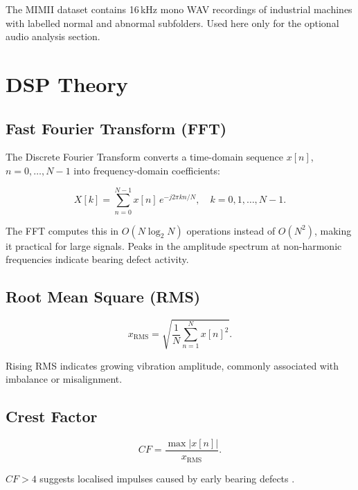 \documentclass[12pt,a4paper]{article}
\begin{document}
The MIMII dataset \cite{purohit2019} contains 16\,kHz mono WAV
recordings of industrial machines with labelled normal and abnormal
subfolders. Used here only for the optional audio analysis section.

\section{DSP Theory}

\subsection{Fast Fourier Transform (FFT)}

The Discrete Fourier Transform converts a time-domain sequence
$x[n]$, $n = 0, \ldots, N-1$ into frequency-domain coefficients:

\begin{equation}
  X[k] = \sum_{n=0}^{N-1} x[n]\, e^{-j2\pi kn/N},
  \quad k = 0, 1, \ldots, N-1.
  \label{eq:dft}
\end{equation}

The FFT computes this in $O(N \log_2 N)$ operations instead of
$O(N^2)$, making it practical for large signals. Peaks in the
amplitude spectrum at non-harmonic frequencies indicate bearing
defect activity.

\subsection{Root Mean Square (RMS)}

\begin{equation}
  x_{\text{RMS}} = \sqrt{\frac{1}{N} \sum_{n=1}^{N} x[n]^2}.
  \label{eq:rms}
\end{equation}

Rising RMS indicates growing vibration amplitude, commonly
associated with imbalance or misalignment.

\subsection{Crest Factor}

\begin{equation}
  CF = \frac{\max |x[n]|}{x_{\text{RMS}}}.
  \label{eq:cf}
\end{equation}

$CF > 4$ suggests localised impulses caused by early bearing
defects \cite{randall2011}.
\end{document}
